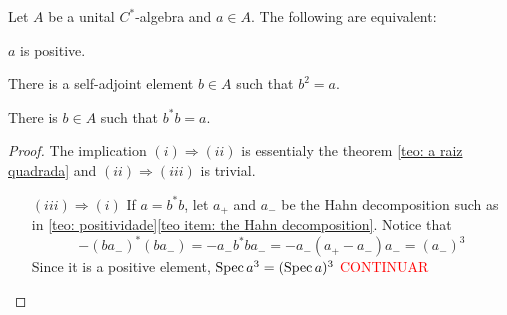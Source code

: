 \begin{lema}
\label{lema: a positive sse a=b(star)b}
Let $A$ be a unital $C^*$-algebra and $a\in A$. The following are equivalent:
\begin{itroman}
\item $a$ is positive.
\item There is a self-adjoint element $b \in A$ such that $b^{2}=a$.
\item There is $b \in A$ such that $b^{*} b=a$.
\end{itroman}
\end{lema}
\begin{proof}
The implication $(i) \Rightarrow (ii)$ is essentialy the theorem \ref{teo: a raiz quadrada} and $(ii) \Rightarrow (iii)$ is trivial. 
\begin{itemize}
    \item[$(iii) \Rightarrow (i)$] If $a= b^*b$, let $a_+$ and $a_-$ be the Hahn decomposition such as in \ref{teo: positividade}\ref{teo item: the Hahn decomposition}. Notice that
    \[-(ba_-)^* (ba_-) = -a_- b^*ba_- = -a_-(a_+-a_-)a_- = (a_-)^3\]
    Since it is a positive element, $\operatorname{Spec} a^3 = (\operatorname{Spec} a)^3$ \textcolor{red}{CONTINUAR} \qedhere
\end{itemize}
\end{proof}


